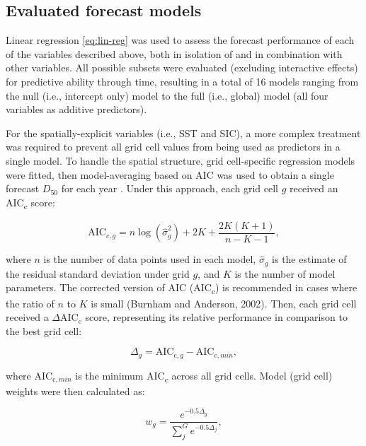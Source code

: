 \documentclass[12pt,]{book}
\theoremstyle{definition}
\theoremstyle{definition}
\theoremstyle{definition}
\theoremstyle{remark}
\begin{document}
\subsection{Evaluated forecast models}\label{rtf-models}

\noindent
Linear regression \eqref{eq:lin-reg} was used to assess the forecast
performance of each of the variables described above, both in isolation
of and in combination with other variables. All possible subsets were
evaluated (excluding interactive effects) for predictive ability through
time, resulting in a total of 16 models ranging from the null (i.e.,
intercept only) model to the full (i.e., global) model (all four
variables as additive predictors).

For the spatially-explicit variables (i.e., SST and SIC), a more complex
treatment was required to prevent all grid cell values from being used
as predictors in a single model. To handle the spatial structure, grid
cell-specific regression models were fitted, then model-averaging based
on AIC was used to obtain a single forecast \(D_{50}\) for each year
\citep{burnham-anderson-2002}. Under this approach, each grid cell \(g\)
received an AIC\textsubscript{c} score:

\begin{equation}
  \text{AIC}_{c,g}=n \log{\left(\hat{\sigma}_g^2\right) + 2K + \frac{2K(K+1)}{n-K-1}},
  \label{eq:aicc}
\end{equation}

\noindent
where \(n\) is the number of data points used in each model,
\(\hat{\sigma}_g\) is the estimate of the residual standard deviation
under grid \(g\), and \(K\) is the number of model parameters. The
corrected version of AIC (AIC\textsubscript{c}) is recommended in cases
where the ratio of \(n\) to \(K\) is small (Burnham and Anderson, 2002).
Then, each grid cell received a \(\Delta\text{AIC}_\text{c}\) score,
representing its relative performance in comparison to the best grid
cell:

\begin{equation}
  \Delta_g=\text{AIC}_{\text{c},g}-\text{AIC}_{\text{c},min},
  \label{eq:delta-aicc}
\end{equation}

\noindent
where \(\text{AIC}_{\text{c},min}\) is the minimum AIC\textsubscript{c}
across all grid cells. Model (grid cell) weights were then calculated
as:

\begin{equation}
  w_g=\frac{e^{-0.5\Delta_g}}{\sum_j^G e^{-0.5\Delta_j}},
\label{eq:aicc-weights}
\end{equation}
\end{document}
